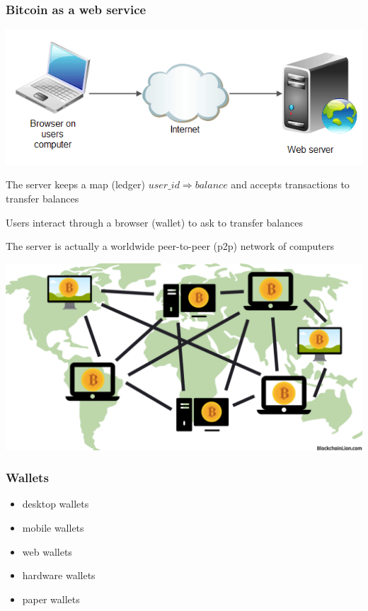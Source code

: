 \documentclass[11pt]{beamer}  %
\begin{document}
\begin{frame}\frametitle{Bitcoin as a web service}

  \begin{center}
    \includegraphics[scale=.3,clip=false]{pictures/web-server.png}
  \end{center}

  \medskip

  The server keeps a map (\alert{ledger}) $\mathit{user\_id}\Rightarrow\mathit{balance}$
  and accepts transactions to transfer balances

  \medskip

  Users interact through a browser (\alert{wallet}) to ask to transfer balances

  \medskip
  The server is actually a worldwide peer-to-peer (p2p) network of computers

  \begin{center}
    \includegraphics[scale=.13,clip=false]{pictures/distributed.png}
  \end{center}

\end{frame}

\begin{frame}\frametitle{Wallets}

  \begin{itemize}
  \item desktop wallets
  \item mobile wallets
  \item web wallets
  \item hardware wallets
  \item paper wallets
  \end{itemize}
  
\end{frame}
\end{document}
